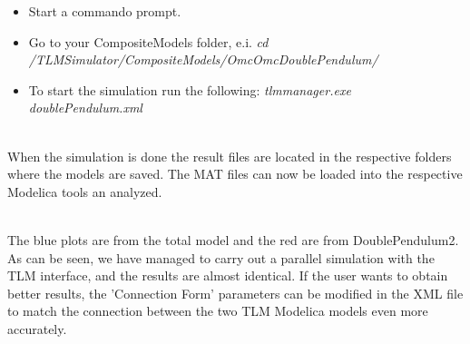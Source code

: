 \begin{itemize}
  \item Start a commando prompt.
  \item Go to your CompositeModels folder, e.i. 
\textit{cd /TLMSimulator/CompositeModels/OmcOmcDoublePendulum/}
  \item To start the simulation run the following: \textit{tlmmanager.exe doublePendulum.xml}
\end{itemize}

~\\When the simulation is done the result files are located in the respective folders where the models are saved. 
The MAT files can now be loaded into the respective Modelica tools an analyzed.

~\\The blue plots are from the total model and the red are from DoublePendulum2. 
As can be seen, we have managed to carry out a parallel simulation with the TLM interface, and the results are almost identical. 
If the user wants to obtain better results, the 'Connection Form' parameters can be modified in the XML file to match the connection between the two TLM Modelica models even more accurately.

